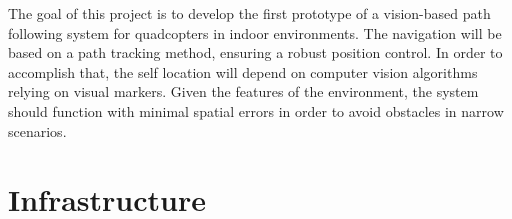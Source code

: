 \documentclass{styles/svproc}
\begin{document}
	
	The goal of this project is to develop the first prototype of a vision-based path following system for quadcopters in indoor environments. The navigation will be based on a path tracking method, ensuring a robust position control. In order to accomplish that, the self location will depend on computer vision algorithms relying on visual markers. Given the features of the environment, the system should function with minimal spatial errors in order to avoid obstacles in narrow scenarios.

\section{Infrastructure}
\end{document}
